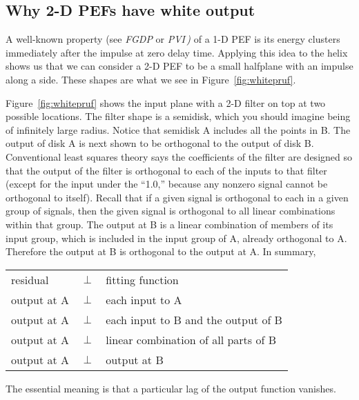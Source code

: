 \subsection{Why 2-D PEFs have white output} 
A well-known property  (see {\em FGDP} or {\em PVI\,) }
of a 1-D PEF is its energy clusters immediately after the
impulse at zero delay time.
Applying this idea to
the helix %
shows us that we can consider a 2-D PEF
to be a small halfplane %
with an impulse along a side.
These shapes are what we see in
Figure~\ref{fig:whitepruf}.


\par
Figure~\ref{fig:whitepruf} shows the input plane with a 2-D filter on top
at two possible locations.
The filter shape is a semidisk,
which you should imagine being of
infinitely large radius.
Notice that semidisk A includes all the points in B.
The output of disk A is next shown to be orthogonal to the output
of disk B.
Conventional least squares theory says the coefficients of the filter
are designed so that the output of the filter
is orthogonal to each of the inputs to that filter
(except for the input under the ``1.0,''
because any nonzero signal cannot be orthogonal to itself).
Recall that if a given signal is orthogonal to each in a given group of signals,
then the given signal is orthogonal
to all linear combinations within that group.
The output at B is a linear combination of members
of its input group,
which is included in the input group of A,
already orthogonal to A.
Therefore the output at B is orthogonal to the output at A.
In summary,
\par            %
\begin{tabular}{lll}
residual     & $\perp$ &  fitting function \\
output at A  & $\perp$ &  each input to A \\
output at A  & $\perp$ &  each input to B and the output of B\\
output at A  & $\perp$ &  linear combination of all parts of B \\
output at A  & $\perp$ &  output at B
\end{tabular}
\par            %
\noindent
The essential meaning is that
a particular lag of the output  function vanishes.

